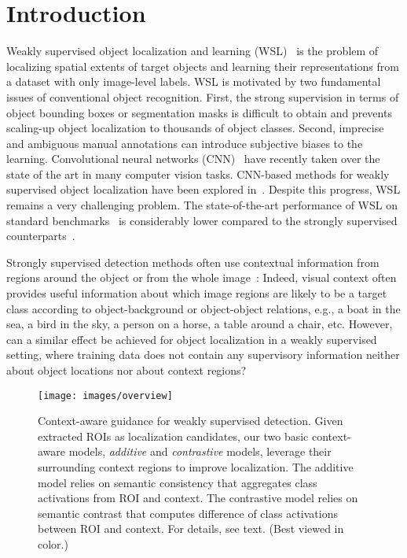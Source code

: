 \documentclass[runningheads]{llncs}
\begin{document}
\section{Introduction}


Weakly supervised object localization and learning
(WSL)~\cite{Wang:2014tg,Cinbis:2015wn} is the problem of localizing spatial
extents of target objects and learning their representations from a dataset with
only image-level labels. WSL is motivated by two fundamental issues of conventional object recognition.
First, the strong supervision in terms of object bounding boxes or segmentation
masks is difficult to obtain and prevents scaling-up object localization to
thousands of object classes. Second, imprecise and ambiguous manual annotations
can introduce subjective biases to the learning. 
Convolutional neural networks (CNN)~\cite{LeCun:1989bx,Krizhevsky:2012wl}
have recently taken over the state of the art in many computer vision tasks.
CNN-based methods for weakly supervised object localization have been explored
in~\cite{Oquab:2015us,Bilen:2015uo}.
Despite this progress, WSL remains a very challenging problem. The state-of-the-art performance
of WSL on standard benchmarks~\cite{Wang:2014tg,Cinbis:2015wn,Bilen:2015uo} is considerably lower compared to the
strongly supervised counterparts~\cite{Girshick:2016ig,ren15fasterrcnn,Gidaris:2015cx}. 



Strongly supervised detection methods often use contextual information from regions around the object or from the whole 
image~\cite{Torralba:2003wk,Rabinovich:2007wy,Felzenszwalb:2009wx,Girshick:2016ig,Gidaris:2015cx, desai09}:
Indeed, visual context often provides useful information about which image regions are likely to
be a target class according to object-background or object-object relations,
e.g., a boat in the sea, a bird in the sky, a person on a horse, a table around
a chair, etc. However, can a similar effect be achieved for object localization
in a weakly supervised setting, where training data does not contain any
supervisory information neither about object locations nor about context regions?

\begin{figure}[t] 
\texttt{[image: images/overview]} 
\vspace{-6ex} 
\caption[small]{Context-aware guidance for weakly supervised detection.
Given extracted ROIs as localization candidates, our two basic context-aware models, {\em additive} and {\em contrastive} models, leverage their surrounding context regions to improve localization. The additive model relies on semantic consistency that aggregates  class activations from ROI and context. The contrastive model relies on semantic contrast that computes  difference of class activations between ROI and context. For details, see text. (Best viewed in color.)} 
\label{fig:intro} 
\end{figure}
\end{document}
